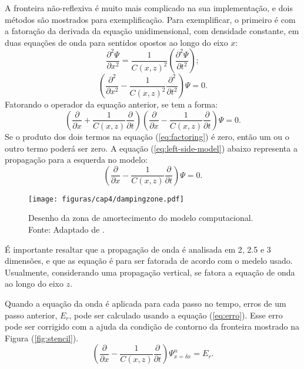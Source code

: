 A fronteira não-reflexiva é muito mais complicado na sua implementação, e dois métodos são mostrados para exemplificação. Para exemplificar, o primeiro é com a fatoração da derivada da equação unidimensional, com densidade constante, em duas equações de onda para sentidos opostos ao longo do eixo $x$:
\begin{equation}
\frac{\partial^2\Psi}{\partial x^2}=\frac{1}{C(x,z)^2}\left(\frac{\partial^2 \Psi}{\partial t^2}\right);
\label{eq:non-reflec1}
\end{equation}
\begin{equation}
\left(\frac{\partial^2}{\partial x^2}-\frac{1}{C(x,z)^2}\frac{\partial^2}{\partial t^2}\right)\Psi=0.
\label{eq:non-reflec2}
\end{equation}
Fatorando o operador da equação anterior, se tem a forma:
\begin{equation}
\left(\frac{\partial}{\partial x}+\frac{1}{C(x,z)}\frac{\partial}{\partial t}\right)\left(\frac{\partial}{\partial x}-\frac{1}{C(x,z)}\frac{\partial}{\partial t}\right)\Psi=0.
\label{eq:factoring}
\end{equation}
Se o produto dos dois termos na equação (\ref{eq:factoring}) é zero, então um ou o outro termo poderá ser zero. A equação (\ref{eq:left-side-model}) abaixo representa a propagação para a esquerda no modelo:
\begin{equation}
\left(\frac{\partial}{\partial x}-\frac{1}{C(x,z)}\frac{\partial}{\partial t}\right)\Psi=0.
\label{eq:left-side-model}
\end{equation}
\begin{figure}[H]
\centering
\texttt{[image: figuras/cap4/dampingzone.pdf]}
\caption{Desenho da zona de amortecimento do modelo computacional. Fonte: Adaptado de \cite{Bording(1997)}.}
\label{fig:damping-zone}
\end{figure}

É importante resaltar que a propagação de onda é analisada em 2, 2.5 e 3 dimensões, e que as equação é para ser fatorada de acordo com o medelo usado. Usualmente, considerando uma propagação vertical, se fatora a equação de onda ao longo do eixo $z$.

Quando a equação da onda é aplicada para cada passo no tempo, erros de um passo anterior, $E_{r}$, pode ser calculado usando a equação (\ref{eq:erro}). Esse erro pode ser corrigido com a ajuda da condição de contorno da fronteira mostrado na Figura (\ref{fig:stencil}).
\begin{equation}
\left(\frac{\partial}{\partial x}-\frac{1}{C(x,z)}\frac{\partial}{\partial t}\right)\Psi^{n}_{x=\delta x}=E_{r}.
\label{eq:erro}
\end{equation}

